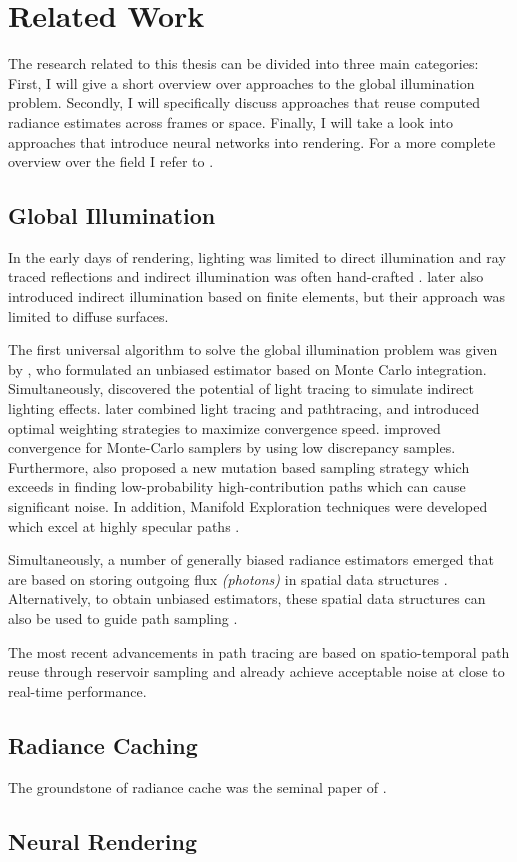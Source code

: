 
\chapter{Related Work}
\label{chap:related}
The research related to this thesis can be divided into three main categories:
First, I will give a short overview over approaches to the global illumination problem.
Secondly, I will specifically discuss approaches that reuse computed radiance estimates across frames or space.
Finally, I will take a look into approaches that introduce neural networks into rendering.
For a more complete overview over the field I refer to \textcite{ritschel2012,kang2016}.

\section{Global Illumination}
In the early days of rendering, lighting was limited to direct illumination and ray traced reflections  and indirect illumination was often hand-crafted .
\textcite{goral1984} later also introduced indirect illumination based on finite elements, but their approach was limited to diffuse surfaces.

The first universal algorithm to solve the global illumination problem was given by \textcite{kajiya1986}, who formulated an unbiased estimator based on Monte Carlo integration.
Simultaneously, \textcite{arvo1986} discovered the potential of light tracing to simulate indirect lighting effects.
\textcite{lafortune1993} later combined light tracing and pathtracing, and \textcite{veach1997} introduced optimal weighting strategies to maximize convergence speed.
\textcite{keller1995,owen1995} improved convergence for Monte-Carlo samplers by using low discrepancy samples.
Furthermore, \textcite{veach1997} also proposed a new mutation based sampling strategy which exceeds in finding low-probability high-contribution paths which can cause significant noise.
In addition, Manifold Exploration techniques were developed which excel at highly specular paths .

Simultaneously, a number of generally biased radiance estimators emerged that are based on storing outgoing flux \textit{(photons)} in spatial data structures .
Alternatively, to obtain unbiased estimators, these spatial data structures can also be used to guide path sampling .

The most recent advancements in path tracing are based on spatio-temporal path reuse through reservoir sampling  and already achieve acceptable noise at close to real-time performance.

\section{Radiance Caching}
The groundstone of radiance cache was the seminal paper of \textcite{ward1988}.

\section{Neural Rendering}